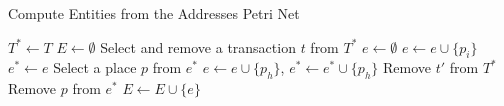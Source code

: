 \documentclass{beamer}
\begin{document}
\begin{frame}[fragile]{}
    \footnotesize
    \begin{algorithm}[H]
        \footnotesize
        \caption{Compute Entities from the Addresses Petri Net}\label{alg:entities}
        \begin{algorithmic}[1]
            \State $T^* \gets T$ 
            \State $E \gets \emptyset$ 
            \State Select and remove a transaction $t$ from $T^*$
            \State $e \gets \emptyset$ 
            \State $e \gets e \cup \{p_i\}$
            \EndFor
            \State $e^* \gets e$ 
            \State Select a place $p$ from $e^*$
            \State $e \gets e \cup \{p_h\}$, $e^* \gets e^* \cup \{p_h\}$
            \EndFor
            \State Remove $t'$ from $T^*$
            \EndFor
            \State Remove $p$ from $e^*$
            \EndWhile
            \State $E \gets E \cup \{e\}$
            \EndWhile
        \end{algorithmic}
    \end{algorithm}
\end{frame}

\end{document}
